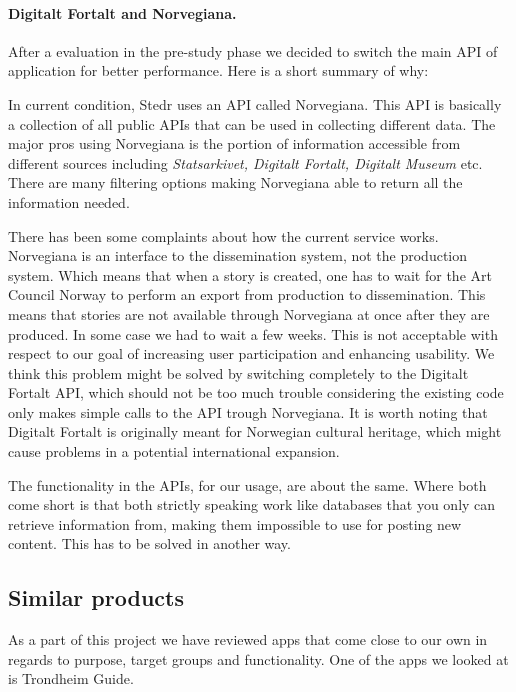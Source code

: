 \paragraph{Digitalt Fortalt and Norvegiana.}

After a evaluation in the pre-study phase we decided to switch the main API of application for better performance. Here is a short summary of why:

In current condition, Stedr uses an API called Norvegiana. This API is basically a collection of all public APIs that can be used in collecting different data. The major pros using Norvegiana is the portion of information accessible from different sources including \emph{Statsarkivet, Digitalt Fortalt, Digitalt Museum} etc. There are many filtering options making Norvegiana able to return all the information needed.

There has been some complaints about how the current service works. Norvegiana is an interface to the dissemination system, not the production system. Which means that when a story is created, one has to wait for the Art Council Norway to perform an export from production to dissemination. This means that stories are not available through Norvegiana at once after they are produced. In some case we had to wait a few weeks. This is not acceptable with respect to our goal of increasing user participation and enhancing usability. We think this problem might be solved by switching completely to the Digitalt Fortalt API, which should not be too much trouble considering the existing code only makes simple calls to the API trough Norvegiana. It is worth noting that Digitalt Fortalt is originally meant for Norwegian cultural heritage, which might cause problems in a potential international expansion.

The functionality in the APIs, for our usage, are about the same. Where both come short is that both strictly speaking work like databases that you only can retrieve information from, making them impossible to use for posting new content. This has to be solved in another way.

	\subsection{Similar products}
		
As a part of this project we have reviewed apps that come close to our own in regards to purpose, target groups and functionality. One of the apps we looked at is Trondheim Guide.

